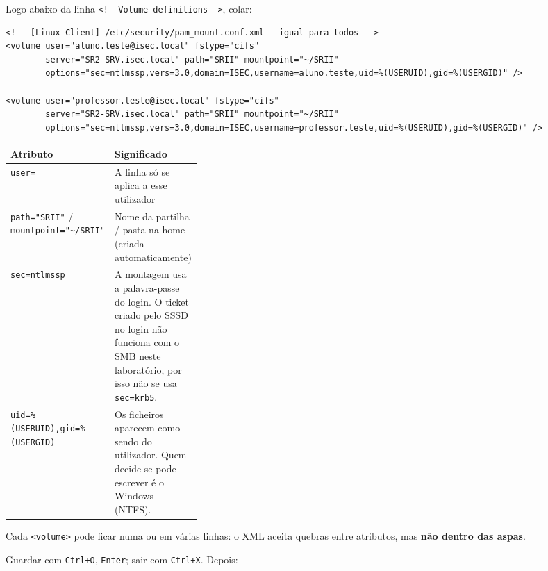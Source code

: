 Logo abaixo da linha \texttt{\textless{}!-- Volume definitions --\textgreater{}}, colar:

\begin{lstlisting}[style=cfgstyle]
<!-- [Linux Client] /etc/security/pam_mount.conf.xml - igual para todos -->
<volume user="aluno.teste@isec.local" fstype="cifs"
        server="SR2-SRV.isec.local" path="SRII" mountpoint="~/SRII"
        options="sec=ntlmssp,vers=3.0,domain=ISEC,username=aluno.teste,uid=%(USERUID),gid=%(USERGID)" />

<volume user="professor.teste@isec.local" fstype="cifs"
        server="SR2-SRV.isec.local" path="SRII" mountpoint="~/SRII"
        options="sec=ntlmssp,vers=3.0,domain=ISEC,username=professor.teste,uid=%(USERUID),gid=%(USERGID)" />
\end{lstlisting}

\begin{center}\small
\begin{tabularx}{\linewidth}{|>{\raggedright\arraybackslash}p{0.32\linewidth}|>{\raggedright\arraybackslash}X|}
\hline
\rowcolor{azul!10}\textbf{Atributo} & \textbf{Significado} \\
\hline
\texttt{user=} & A linha só se aplica a esse utilizador \\
\hline
\texttt{path="SRII"} / \texttt{mountpoint="\textasciitilde{}/\allowbreak{}SRII"} & Nome da partilha / pasta na home (criada automaticamente) \\
\hline
\texttt{sec=ntlmssp} & A montagem usa a palavra-passe do login. O ticket criado pelo SSSD no login não funciona com o SMB neste laboratório, por isso não se usa \texttt{sec=krb5}. \\
\hline
\texttt{uid=\%(USERUID),\allowbreak{}gid=\%(USERGID)} & Os ficheiros aparecem como sendo do utilizador. Quem decide se pode escrever é o Windows (NTFS). \\
\hline
\end{tabularx}
\end{center}

\begin{simplesbox}
Cada \texttt{\textless{}volume\textgreater{}} pode ficar numa ou em várias linhas: o XML aceita quebras entre atributos, mas \textbf{não dentro das aspas}.
\end{simplesbox}


Guardar com \texttt{Ctrl+O}, \texttt{Enter}; sair com \texttt{Ctrl+X}. Depois:

